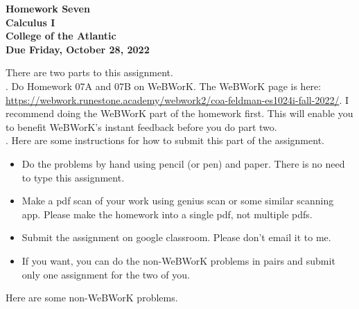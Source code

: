 \documentclass[12pt]{article}
\begin{document}
\pagestyle{empty}
 
\begin{center}
{\LARGE {\bf Homework Seven}}\\
\bigskip
{\Large {\bf Calculus I}}\\
\bigskip
{\Large {\bf College of the Atlantic}}\\
\bigskip
{ {\bf Due Friday, October 28, 2022}}\\ 
\end{center}
\medskip

\noindent There are two parts to this assignment.\\

.  Do Homework 07A and 07B on
WeBWorK.  The WeBWorK page is here: 
\url{https://webwork.runestone.academy/webwork2/coa-feldman-es1024i-fall-2022/}.
I recommend doing the WeBWorK part of the homework first.  This will
enable you to benefit WeBWorK's instant feedback before you do part
two.\\ 


.  Here are some
instructions for how to submit this part of the assignment.
\begin{itemize}
  \setlength{\itemsep}{0mm}
\item Do the problems by hand using pencil (or pen) and paper.
  There is no need to type this assignment.
\item Make a pdf scan of your work using genius scan or some
  similar scanning app.  Please make the homework into a single
  pdf, not multiple pdfs.
\item Submit the assignment on google classroom.  Please don't
  email it to me.
\item If you want, you can do the non-WeBWorK problems in pairs and
  submit only one assignment for the two of you. \\
\end{itemize}

\noindent Here are some non-WeBWorK problems.\\
\end{document}
